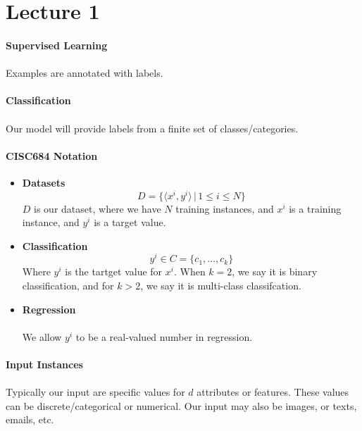\documentclass[letterpaper,12pt]{article}
\begin{document}
\section*{Lecture 1}
\paragraph{Supervised Learning}
\paragraph{}Examples are annotated with labels.
\paragraph{Classification}
\paragraph{}Our model will provide labels from a finite set of classes/categories.
\paragraph{CISC684 Notation}
\begin{itemize}
    \item \textbf{Datasets}
\[D = \{\langle x^i, y^i\rangle\,|\, 1 \le i \le N\} \]
$D$ is our dataset, where we have $N$ training instances, and $x^i$ is a training instance, and $y^i$ is a target value.

\item \textbf{Classification}
    \[y^i \in C = \{c_1, \ldots, c_k\}\]
Where $y^i$ is the tartget value for $x^i$. When $k = 2$, we say it is binary classification, and
for $k > 2$, we say it is multi-class classifcation.
\item \textbf{Regression}
\paragraph{}We allow $y^i$ to be a real-valued number in regression.
\end{itemize}
\paragraph{Input Instances}
\paragraph{}Typically our input are specific values for $d$ attributes or features. These values
can be discrete/categorical or numerical. Our input may also be images, or texts, emails, etc.
\end{document}
